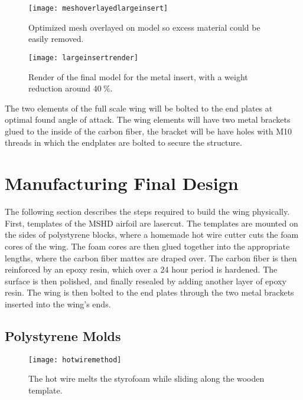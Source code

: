   \begin{figure}
    \texttt{[image: meshoverlayedlargeinsert]}
    \caption{Optimized mesh overlayed on model so excess material could be easily removed.}
    \label{fig:meshoverlay}
  \end{figure}

  \begin{figure}
    \texttt{[image: largeinsertrender]}
    \caption{Render of the final model for the metal insert, with a weight reduction around $\SI{40}{\%}$.}
    \label{fig:render_large_insert}
  \end{figure}

  The two elements of the full scale wing will be bolted to the end plates at optimal found angle of attack. The wing elements will have two metal brackets glued to the inside of the carbon fiber, the bracket will be have holes with M10 threads in which the endplates are bolted to secure the structure.

\section{Manufacturing Final Design}

  The following section describes the steps required to build the wing physically. First, templates of the MSHD airfoil are lasercut. The templates are mounted on the sides of polystyrene blocks, where a homemade hot wire cutter cuts the foam cores of the wing. The foam cores are then glued together into the appropriate lengths, where the carbon fiber mattes are draped over. The carbon fiber is then reinforced by an epoxy resin, which over a 24 hour period is hardened. The surface is then polished, and finally resealed by adding another layer of epoxy resin. The wing is then bolted to the end plates through the two metal brackets inserted into the wing's ends.

  \subsection{Polystyrene Molds}

  \begin{figure}
    \texttt{[image: hotwiremethod]}
    \caption{The hot wire melts the styrofoam while sliding along the wooden template.}
    \label{fig:hotwire}
  \end{figure}

